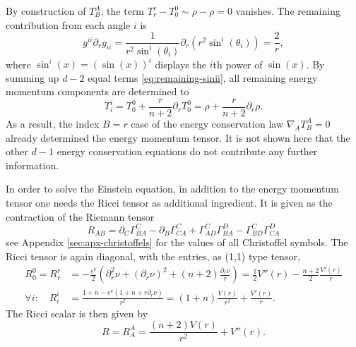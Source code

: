 \documentclass[12pt,a4paper]{report}
\numberwithin{equation}{chapter}
\begin{document}
By construction of $T^A_B$, the term $T^r_r - T^0_0\sim \rho-\rho=0$ vanishes. The remaining contribution from each angle $i$ is
\begin{equation}\label{eq:remaining-sinii}
g^{ii}\partial_r g_{ii}
=
\frac 1{ r^2 \sin^i(\theta_i) }
\partial_r
\left(
r^2 \sin^i(\theta_i)
\right)
= \frac 2r,
\end{equation}
where $\sin^i(x)=\left(\sin(x)\right)^i$ displays the $i$th power of $\sin(x)$. By summing up $d-2$ equal terms \eqref{eq:remaining-sinii}, all remaining energy momentum components are determined to
\begin{equation}\label{eq:outward-pressure}
T^i_i = T^0_0 + \frac r{n+2} \partial_r T^0_0
=  \rho + \frac r{n+2} \partial_r \rho.
\end{equation}
As a result, the index $B=r$ case of the energy conservation law $\nabla_A T^A_B=0$ already determined the energy momentum tensor. It is not shown here that the other $d-1$ energy conservation equations do not contribute any further information.

In order to solve the Einstein equation, in addition to the energy momentum tensor one needs the Ricci tensor as additional ingredient. It is given as the contraction of the Riemann tensor
\begin{equation}
%
R_{AB} =
  \partial_C \Gamma^C_{BA}
- \partial_B \Gamma^C_{CA}
+ \Gamma^C_{AD} \Gamma^D_{BA}
- \Gamma^C_{BD} \Gamma^D_{CA}
\end{equation}
see Appendix \ref{sec:apx-christoffels} for the values of all Christoffel symbols. The Ricci tensor is again diagonal, with the entries, as (1,1) type tensor,
\begin{subequations} \label{eq:derivation-ricci-tensor}
\begin{align}
R^0_0 = R^r_r &= - \frac{e^\nu}2
\left( \partial_r^2 \nu + (\partial_r \nu)^2
+ (n+2) \frac{\partial_r \nu}r
\right)
=
\frac 12 V''(r) - \frac{n+2}{2} \frac{V'(r)}{r}
\\
\forall i:\quad R^i_i &=
\frac{1 + n - e^\nu
\left( 1 + n + r \partial_r \nu \right)
}{r^2}
=
(1+n)\frac{V(r)}{r^2} + \frac{V'(r)}{r}.
\end{align}
\end{subequations}
%
The Ricci scalar is then given by
\begin{equation}
R = R^A_A = \frac{(n+2) V(r)}{r^2}+V''(r).
\end{equation}
\end{document}
